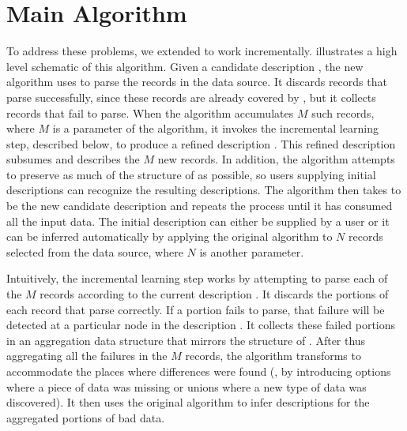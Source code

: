\section{Main Algorithm}\label{sec:algo}

To address these problems, we extended \learnpads{} to work
incrementally.  
 illustrates a high level schematic of this
algorithm. 
Given a candidate description , the new algorithm uses  to parse
the records in the data source.  
It discards records that parse successfully, since these records are
already covered by , but it collects records that fail to parse.
When the algorithm accumulates $M$ such records, where $M$ is a
parameter of the algorithm, it invokes the incremental learning step,
described below, to produce a refined description .  This refined
description subsumes  and describes the $M$
new records.  In addition, the algorithm attempts to preserve as much
of the structure of  as possible, so users supplying initial
descriptions can recognize the resulting descriptions. 
The algorithm then takes 
to be the new candidate description and repeats the process until it
has consumed all the input data.
The initial description  can either be supplied by a user or it
can be inferred automatically by applying the original algorithm to
$N$ records selected from the data source, where $N$ is another
parameter.  


Intuitively, the incremental learning step works by attempting to
parse each of the $M$ records according to the current description
.  It discards the portions of each record that parse correctly.
If a portion fails to parse, that failure will be detected at a
particular node in the description . It collects these failed
portions in an aggregation data structure  that mirrors the
structure of .  After thus aggregating all the failures in the $M$
records, the algorithm transforms  to accommodate the places where
differences were found (\ie, by introducing options where a piece of
data was missing or unions where a new type of data was discovered).
It then uses the original \learnpads{} algorithm to infer descriptions
for the aggregated portions of bad data. 

